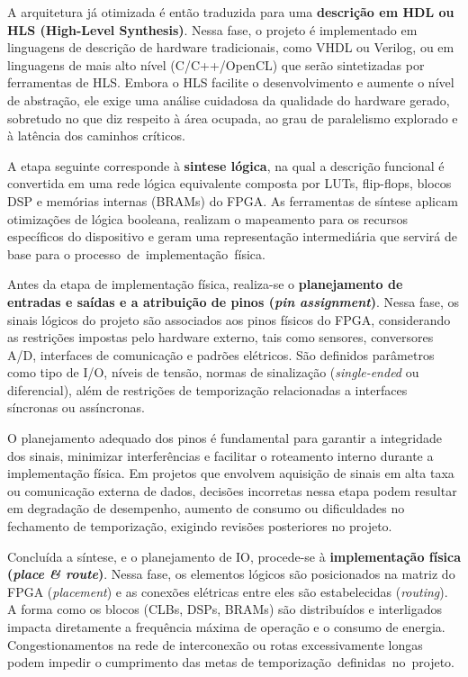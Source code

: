 A arquitetura já otimizada é então traduzida para uma \textbf{descrição em HDL ou HLS (High-Level Synthesis)}. Nessa fase, o projeto é implementado em linguagens de descrição de hardware tradicionais, como VHDL ou Verilog, ou em linguagens de mais alto nível (C/C++/OpenCL) que serão sintetizadas por ferramentas de HLS. Embora o HLS facilite o desenvolvimento e aumente o nível de abstração, ele exige uma análise cuidadosa da qualidade do hardware gerado, sobretudo no que diz respeito à área ocupada, ao grau de paralelismo explorado e à latência dos caminhos críticos.

A etapa seguinte corresponde à \textbf{sintese lógica}, na qual a descrição funcional é convertida em uma rede lógica equivalente composta por LUTs, flip-flops, blocos DSP e memórias internas (BRAMs) do FPGA. As ferramentas de síntese aplicam otimizações de lógica booleana, realizam o mapeamento para os recursos específicos do dispositivo e geram uma representação intermediária que servirá de base para o \mbox{processo de implementação física.}

Antes da etapa de implementação física, realiza-se o \textbf{planejamento de
entradas e saídas e a atribuição de pinos (\textit{pin assignment})}. Nessa fase,
os sinais lógicos do projeto são associados aos pinos físicos do FPGA,
considerando as restrições impostas pelo hardware externo, tais como sensores,
conversores A/D, interfaces de comunicação e padrões elétricos. São definidos
parâmetros como tipo de I/O, níveis de tensão, normas de sinalização
(\textit{single-ended} ou diferencial), além de restrições de temporização
relacionadas a interfaces síncronas ou assíncronas.

O planejamento adequado dos pinos é fundamental para garantir a integridade dos
sinais, minimizar interferências e facilitar o roteamento interno durante a
implementação física. Em projetos que envolvem aquisição de sinais em alta taxa
ou comunicação externa de dados, decisões incorretas nessa etapa podem resultar
em degradação de desempenho, aumento de consumo ou dificuldades no fechamento de
temporização, exigindo revisões posteriores no projeto.

Concluída a síntese, e o planejamento de IO, procede-se à \textbf{implementação física (\textit{place \& route})}. Nessa fase, os elementos lógicos são posicionados na matriz do FPGA (\textit{placement}) e as conexões elétricas entre eles são estabelecidas (\textit{routing}). A forma como os blocos (CLBs, DSPs, BRAMs) são distribuídos e interligados impacta diretamente a frequência máxima de operação e o consumo de energia. Congestionamentos na rede de interconexão ou rotas excessivamente longas podem impedir o cumprimento das metas de \mbox{temporização definidas no projeto.}

